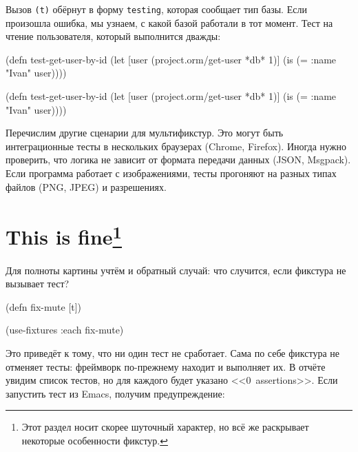\fi

Вызов \verb|(t)| обёрнут в форму \verb|testing|, которая сообщает тип базы. Если
произошла ошибка, мы узнаем, с какой базой работали в тот момент. Тест на чтение
пользователя, который выполнится дважды:

\ifnarrow

\begin{english}
  \begin{clojure}
(defn test-get-user-by-id
  (let [user
        (project.orm/get-user *db* 1)]
    (is (= {:name "Ivan"} user))))
  \end{clojure}
\end{english}

\else

\begin{english}
  \begin{clojure}
(defn test-get-user-by-id
  (let [user (project.orm/get-user *db* 1)]
    (is (= {:name "Ivan"} user))))
  \end{clojure}
\end{english}

\fi

Перечислим другие сценарии для мультификстур. Это могут быть интеграционные
тесты в нескольких браузерах (Chrome, Firefox). Иногда нужно проверить, что
логика не зависит от формата передачи данных (JSON, Msgpack). Если программа
работает с изображениями, тесты прогоняют на разных типах файлов (PNG, JPEG) и
разрешениях.

\section[This is fine]{This is fine\footnote{%
    Этот раздел носит скорее шуточный характер,
    но всё же раскрывает некоторые особенности фикстур.}}

Для полноты картины учтём и обратный случай: что случится, если фикстура не
вызывает тест?


\begin{english}
  \begin{clojure}
(defn fix-mute [t])

(use-fixtures :each fix-mute)
  \end{clojure}
\end{english}

Это приведёт к тому, что ни один тест не сработает. Сама по себе фикстура не
отменяет тесты: фреймворк по-прежнему находит и выполняет их. В отчёте увидим
список тестов, но для каждого будет указано <<0~assertions>>. Если запустить
тест из Emacs, получим предупреждение:

